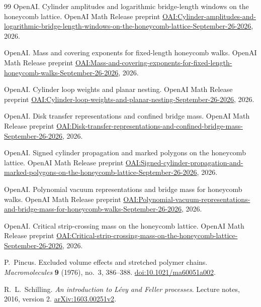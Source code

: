 \begin{thebibliography}{99}
OpenAI.
Cylinder amplitudes and logarithmic bridge-length windows on the honeycomb lattice.
OpenAI Math Release preprint
\href{https://github.com/openai/math/blob/main/preprints/Cylinder-amplitudes-and-logarithmic-bridge-length-windows-on-the-honeycomb-lattice-September-26-2026/main.pdf}{OAI:Cylinder-amplitudes-and-logarithmic-bridge-length-windows-on-the-honeycomb-lattice-September-26-2026},
2026.

OpenAI.
Mass and covering exponents for fixed-length honeycomb walks.
OpenAI Math Release preprint
\href{https://github.com/openai/math/blob/main/preprints/Mass-and-covering-exponents-for-fixed-length-honeycomb-walks-September-26-2026/main.pdf}{OAI:Mass-and-covering-exponents-for-fixed-length-honeycomb-walks-September-26-2026},
2026.

OpenAI.
Cylinder loop weights and planar nesting.
OpenAI Math Release preprint
\href{https://github.com/openai/math/blob/main/preprints/Cylinder-loop-weights-and-planar-nesting-September-26-2026/main.pdf}{OAI:Cylinder-loop-weights-and-planar-nesting-September-26-2026},
2026.

OpenAI.
Disk transfer representations and confined bridge mass.
OpenAI Math Release preprint
\href{https://github.com/openai/math/blob/main/preprints/Disk-transfer-representations-and-confined-bridge-mass-September-26-2026/main.pdf}{OAI:Disk-transfer-representations-and-confined-bridge-mass-September-26-2026},
2026.

OpenAI.
Signed cylinder propagation and marked polygons on the honeycomb lattice.
OpenAI Math Release preprint
\href{https://github.com/openai/math/blob/main/preprints/Signed-cylinder-propagation-and-marked-polygons-on-the-honeycomb-lattice-September-26-2026/main.pdf}{OAI:Signed-cylinder-propagation-and-marked-polygons-on-the-honeycomb-lattice-September-26-2026},
2026.

OpenAI.
Polynomial vacuum representations and bridge mass for honeycomb walks.
OpenAI Math Release preprint
\href{https://github.com/openai/math/blob/main/preprints/Polynomial-vacuum-representations-and-bridge-mass-for-honeycomb-walks-September-26-2026/main.pdf}{OAI:Polynomial-vacuum-representations-and-bridge-mass-for-honeycomb-walks-September-26-2026},
2026.

OpenAI.
Critical strip-crossing mass on the honeycomb lattice.
OpenAI Math Release preprint
\href{https://github.com/openai/math/blob/main/preprints/Critical-strip-crossing-mass-on-the-honeycomb-lattice-September-26-2026/main.pdf}{OAI:Critical-strip-crossing-mass-on-the-honeycomb-lattice-September-26-2026},
2026.

 P.~Pincus. Excluded volume effects and stretched polymer chains. \emph{Macromolecules} \textbf{9} (1976), no.~3, 386--388. \href{https://doi.org/10.1021/ma60051a002}{doi:10.1021/ma60051a002}.

 R.~L.~Schilling. \emph{An introduction to L\'evy and Feller processes}. Lecture notes, 2016, version 2. \href{https://arxiv.org/abs/1603.00251v2}{arXiv:1603.00251v2}.
\end{thebibliography}
